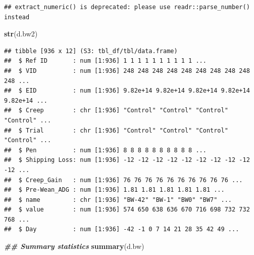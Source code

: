 \documentclass[
]{book}
\newenvironment{Shaded}{\begin{snugshade}}{\end{snugshade}}
\newcommand{\DocumentationTok}[1]{\textcolor[rgb]{0.56,0.35,0.01}{\textbf{\textit{#1}}}}
\newcommand{\FunctionTok}[1]{\textcolor[rgb]{0.13,0.29,0.53}{\textbf{#1}}}
\newcommand{\NormalTok}[1]{#1}
\newcommand{\OtherTok}[1]{\textcolor[rgb]{0.56,0.35,0.01}{#1}}
\newcommand{\SpecialCharTok}[1]{\textcolor[rgb]{0.81,0.36,0.00}{\textbf{#1}}}
\begin{document}
\begin{Shaded}
\end{Shaded}

\begin{verbatim}
## extract_numeric() is deprecated: please use readr::parse_number() instead
\end{verbatim}

\begin{Shaded}
\begin{Highlighting}[]
\FunctionTok{str}\NormalTok{(d.bw2)}
\end{Highlighting}
\end{Shaded}

\begin{verbatim}
## tibble [936 x 12] (S3: tbl_df/tbl/data.frame)
##  $ Ref ID       : num [1:936] 1 1 1 1 1 1 1 1 1 1 ...
##  $ VID          : num [1:936] 248 248 248 248 248 248 248 248 248 248 ...
##  $ EID          : num [1:936] 9.82e+14 9.82e+14 9.82e+14 9.82e+14 9.82e+14 ...
##  $ Creep        : chr [1:936] "Control" "Control" "Control" "Control" ...
##  $ Trial        : chr [1:936] "Control" "Control" "Control" "Control" ...
##  $ Pen          : num [1:936] 8 8 8 8 8 8 8 8 8 8 ...
##  $ Shipping Loss: num [1:936] -12 -12 -12 -12 -12 -12 -12 -12 -12 -12 ...
##  $ Creep_Gain   : num [1:936] 76 76 76 76 76 76 76 76 76 76 ...
##  $ Pre-Wean_ADG : num [1:936] 1.81 1.81 1.81 1.81 1.81 ...
##  $ name         : chr [1:936] "BW-42" "BW-1" "BW0" "BW7" ...
##  $ value        : num [1:936] 574 650 638 636 670 716 698 732 732 768 ...
##  $ Day          : num [1:936] -42 -1 0 7 14 21 28 35 42 49 ...
\end{verbatim}

\begin{Shaded}
\begin{Highlighting}[]
\DocumentationTok{\#\# Summary statistics}
\FunctionTok{summary}\NormalTok{(d.bw)}
\end{Highlighting}
\end{Shaded}
\end{document}
